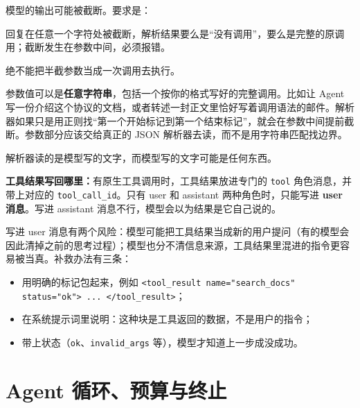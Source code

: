模型的输出可能被截断。要求是：
\begin{tcolorbox}[enhanced, sharp corners, boxrule=0pt, frame hidden,
                  borderline west={3pt}{0pt}{structurecolor},
                  colback=structurecolor!5]
回复在任意一个字符处被截断，解析结果要么是“没有调用”，要么是完整的原调用；截断发生在参数中间，必须报错。
\end{tcolorbox}
绝不能把半截参数当成一次调用去执行。

参数值可以是\textbf{任意字符串}，包括一个按你的格式写好的完整调用。比如让 Agent 写一份介绍这个协议的文档，或者转述一封正文里恰好写着调用语法的邮件。解析器如果只是用正则找“第一个开始标记到第一个结束标记”，就会在参数中间提前截断。参数部分应该交给真正的 JSON 解析器去读，而不是用字符串匹配找边界。

\begin{tcolorbox}[colback=second!5, colframe=second, title=总结一个原则]
  解析器读的是模型写的文字，而模型写的文字可能是任何东西。
\end{tcolorbox}

\noindent\textbf{工具结果写回哪里：}有原生工具调用时，工具结果放进专门的 \texttt{tool} 角色消息，并带上对应的 \texttt{tool\_call\_id}。只有 user 和 assistant 两种角色时，只能写进 \textbf{user 消息}。写进 assistant 消息不行，模型会以为结果是它自己说的。

写进 user 消息有两个风险：模型可能把工具结果当成新的用户提问（有的模型会因此清掉之前的思考过程）；模型也分不清信息来源，工具结果里混进的指令更容易被当真。补救办法有三条：
\begin{itemize}
  \item 用明确的标记包起来，例如 \verb|<tool_result name="search_docs" status="ok"> ... </tool_result>|；
  \item 在系统提示词里说明：这种块是工具返回的数据，不是用户的指令；
  \item 带上状态（\texttt{ok}、\texttt{invalid\_args} 等），模型才知道上一步成没成功。
\end{itemize}

\section{Agent 循环、预算与终止}
